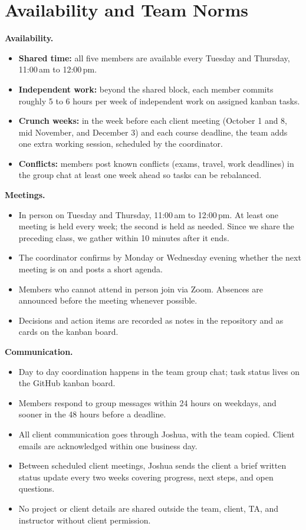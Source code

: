 \documentclass[11pt]{article}
\begin{document}
\section{Availability and Team Norms}

\textbf{Availability.}
\begin{itemize}
  \item \textbf{Shared time:} all five members are available every Tuesday and Thursday, 11:00\,am to 12:00\,pm.
  \item \textbf{Independent work:} beyond the shared block, each member commits roughly 5 to 6 hours per week of independent work on assigned kanban tasks.
  \item \textbf{Crunch weeks:} in the week before each client meeting (October 1 and 8, mid November, and December 3) and each course deadline, the team adds one extra working session, scheduled by the coordinator.
  \item \textbf{Conflicts:} members post known conflicts (exams, travel, work deadlines) in the group chat at least one week ahead so tasks can be rebalanced.
\end{itemize}

\textbf{Meetings.}
\begin{itemize}
  \item In person on Tuesday and Thursday, 11:00\,am to 12:00\,pm. At least one meeting is held every week; the second is held as needed. Since we share the preceding class, we gather within 10 minutes after it ends.
  \item The coordinator confirms by Monday or Wednesday evening whether the next meeting is on and posts a short agenda.
  \item Members who cannot attend in person join via Zoom. Absences are announced before the meeting whenever possible.
  \item Decisions and action items are recorded as notes in the repository and as cards on the kanban board.
\end{itemize}

\textbf{Communication.}
\begin{itemize}
  \item Day to day coordination happens in the team group chat; task status lives on the GitHub kanban board.
  \item Members respond to group messages within 24 hours on weekdays, and sooner in the 48 hours before a deadline.
  \item All client communication goes through Joshua, with the team copied. Client emails are acknowledged within one business day.
  \item Between scheduled client meetings, Joshua sends the client a brief written status update every two weeks covering progress, next steps, and open questions.
  \item No project or client details are shared outside the team, client, TA, and instructor without client permission.
\end{itemize}
\end{document}
